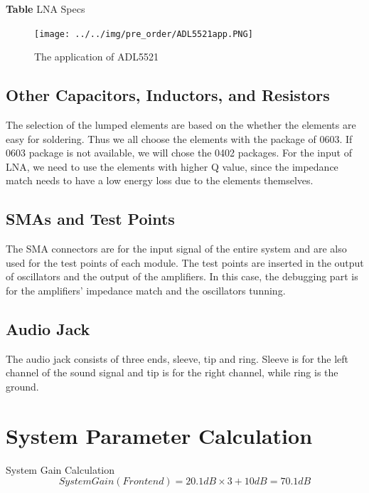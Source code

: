 \documentclass[]{article}
\begin{document}
        \begin{center}
            \textbf{Table} LNA Specs
        \end{center}

        \begin{figure}[p]
            \begin{center}
                \texttt{[image: ../../img/pre\_order/ADL5521app.PNG]}~
                \label{ADL5521}
                \caption{The application of ADL5521}
            \end{center}
        \end{figure}

    \subsection{Other Capacitors, Inductors, and Resistors}
        The selection of the lumped elements are based on the whether the
        elements are easy for soldering. Thus we all choose the elements with
        the package of 0603. If 0603 package is not available, we will chose the
        0402 packages. For the input of LNA, we need to use the elements with
        higher Q value, since the impedance match needs to have a low energy
        loss due to the elements themselves.
    \subsection{SMAs and Test Points}
        The SMA connectors are for the input signal of the entire system and are
        also used for the test points of each module. The test points are
        inserted in the output of oscillators and the output of the amplifiers.
        In this case, the debugging part is for the amplifiers' impedance match
        and the oscillators tunning.
    \subsection{Audio Jack}
        The audio jack consists of three ends, sleeve, tip and ring. Sleeve is
        for the left channel of the sound signal and tip is for the right
        channel, while ring is the ground.

\section{System Parameter Calculation}
    System Gain Calculation
    \begin{equation}
        System Gain (Front end) = 20.1dB \times 3 + 10dB = 70.1dB
    \end{equation}
\end{document}
